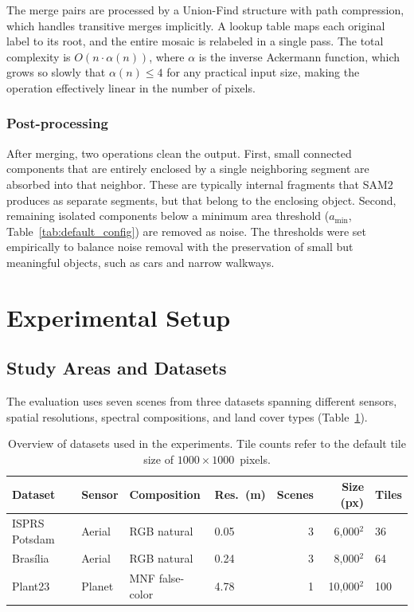 \documentclass[review,11pt,authoryear]{elsarticle}
\begin{document}
The merge pairs are processed by a Union-Find structure \citep{tarjan1975union} with path compression, which handles transitive merges implicitly. A lookup table maps each original label to its root, and the entire mosaic is relabeled in a single pass. The total complexity is $O(n \cdot \alpha(n))$, where $\alpha$ is the inverse Ackermann function, which grows so slowly that $\alpha(n) \leq 4$ for any practical input size, making the operation effectively linear in the number of pixels.

\subsubsection{Post-processing}
\label{sec:method_postproc}

After merging, two operations clean the output. First, small connected components that are entirely enclosed by a single neighboring segment are absorbed into that neighbor. These are typically internal fragments that SAM2 produces as separate segments, but that belong to the enclosing object. Second, remaining isolated components below a minimum area threshold ($a_{\min}$, Table~\ref{tab:default_config}) are removed as noise. The thresholds were set empirically to balance noise removal with the preservation of small but meaningful objects, such as cars and narrow walkways.


\section{Experimental Setup}
\label{sec:experiments}

\subsection{Study Areas and Datasets}
\label{sec:exp_data}

The evaluation uses seven scenes from three datasets spanning different sensors, spatial resolutions, spectral compositions, and land cover types (Table~\ref{tab:datasets}).

\begin{table}[htbp]
\centering
\caption{Overview of datasets used in the experiments. Tile counts refer to the default tile size of $1000 \times 1000$~pixels.}
\label{tab:datasets}
\begin{tabular}{llllrrl}
\toprule
Dataset & Sensor & Composition & Res.\ (m) & Scenes & Size (px) & Tiles \\
\midrule
ISPRS Potsdam & Aerial & RGB natural & 0.05 & 3 & 6{,}000$^2$ & 36 \\
Bras\'{i}lia & Aerial & RGB natural & 0.24 & 3 & 8{,}000$^2$ & 64 \\
Plant23 & Planet & MNF false-color & 4.78 & 1 & 10{,}000$^2$ & 100 \\
\bottomrule
\end{tabular}
\end{table}
\end{document}
